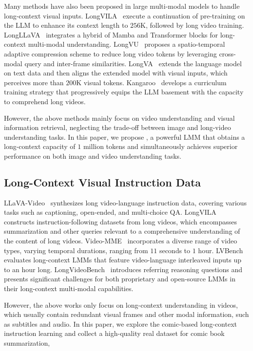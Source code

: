 %
Many methods have also been proposed in large multi-modal models to handle long-context visual inputs.
%
LongVILA~\cite{LongVILA} execute a continuation of pre-training on the LLM to enhance its context length to $256$K, followed by long video training.
%
LongLLaVA~\cite{LongLLaVA} integrates a hybrid of Mamba and Transformer blocks for long-context multi-modal understanding.
%
LongVU~\cite{LongVU} proposes a spatio-temporal adaptive compression scheme to reduce long video tokens by leveraging cross-modal query and inter-frame similarities.
%
LongVA~\cite{LongVA} extends the language model on text data and then aligns the extended model with visual inputs, which perceives more than $200$K visual tokens.
%
Kangaroo~\cite{Kangaroo} develops a curriculum training strategy that progressively equips the LLM basement with the capacity to comprehend long videos.
%


%
However, the above methods mainly focus on video understanding and visual information retrieval, neglecting the trade-off between image and long-video understanding tasks.
%
In this paper, we propose \OurMethod, a powerful LMM that obtains a long-context capacity of $1$ million tokens and simultaneously achieves superior performance on both image and video understanding tasks.
%



\subsection{Long-Context Visual Instruction Data}
%
LLaVA-Video~\cite{LLaVA-Video} synthesizes long video-language instruction data, covering various tasks such as captioning, open-ended, and multi-choice QA.
%
LongVILA~\cite{LongVILA} constructs instruction-following datasets from long videos, which encompasses summarization and other queries relevant to a comprehensive understanding of the content of long videos.
%
%
Video-MME~\cite{Video-MME} incorporates a diverse range of video types, varying temporal durations, ranging from $11$ seconds to $1$ hour.
%
LVBench~\cite{LVBench} evaluates long-context LMMs that feature video-language interleaved inputs up to an hour long.
%
LongVideoBench~\cite{LongVideoBench} introduces referring reasoning questions and presents significant challenges for both proprietary and open-source LMMs in their long-context multi-modal capabilities.
%


%
However, the above works only focus on long-context understanding in videos, which usually contain redundant visual frames and other modal information, such as subtitles and audio.
%
In this paper, we explore the comic-based long-context instruction learning and collect a high-quality real dataset for comic book summarization,
%

